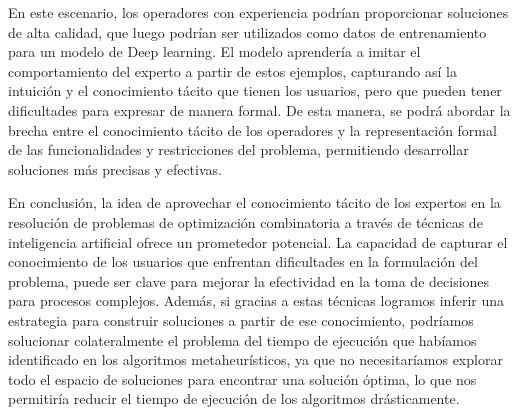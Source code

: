 En este escenario, los operadores con experiencia podrían proporcionar soluciones de alta calidad, que luego 
podrían ser utilizados como datos de entrenamiento para un modelo de Deep learning. El modelo aprendería 
a imitar el comportamiento del experto a partir de estos ejemplos, capturando así la intuición y el conocimiento 
tácito que tienen los usuarios, pero que pueden tener dificultades para expresar de manera formal. De esta manera, 
se podrá abordar la brecha entre el conocimiento tácito de los operadores y la representación formal de las 
funcionalidades y restricciones del problema, permitiendo desarrollar soluciones más precisas y efectivas.\medskip

En conclusión, la idea de aprovechar el conocimiento tácito de los expertos en la resolución de problemas de 
optimización combinatoria a través de técnicas de inteligencia artificial ofrece un prometedor potencial. La 
capacidad de capturar el conocimiento de los usuarios que enfrentan dificultades en la formulación
del problema, puede ser clave para mejorar la efectividad en la toma de decisiones para procesos complejos. Además,
si gracias a estas técnicas logramos inferir una estrategia para construir soluciones a partir de ese conocimiento,
podríamos solucionar colateralmente el problema del tiempo de ejecución que habíamos identificado en los algoritmos 
metaheurísticos, ya que no necesitaríamos explorar todo el espacio de soluciones para encontrar una solución óptima,
lo que nos permitiría reducir el tiempo de ejecución de los algoritmos drásticamente.



\pagebreak